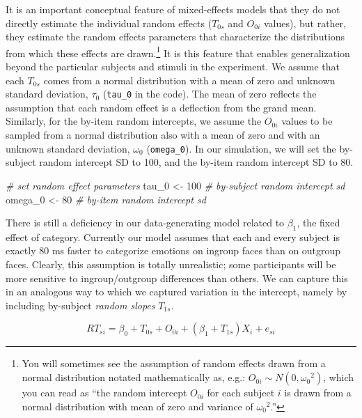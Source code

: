 \documentclass[
  english,
  doc,floatsintext]{apa6}
\newenvironment{Shaded}{\begin{snugshade}}{\end{snugshade}}
\newcommand{\CommentTok}[1]{\textcolor[rgb]{0.56,0.35,0.01}{\textit{#1}}}
\newcommand{\DecValTok}[1]{\textcolor[rgb]{0.00,0.00,0.81}{#1}}
\newcommand{\NormalTok}[1]{#1}
\newcommand{\StringTok}[1]{\textcolor[rgb]{0.31,0.60,0.02}{#1}}
\begin{document}
It is an important conceptual feature of mixed-effects models that they do not directly estimate the individual random effects (\(T_{0s}\) and \(O_{0i}\) values), but rather, they estimate the random effects parameters that characterize the distributions from which these effects are drawn.\footnote{You will sometimes see the assumption of random effects drawn from a normal distribution notated mathematically as, e.g.: $O_{0i} \sim N(0, {\omega_0}^2)$, which you can read as ``the random intercept $O_{0i}$ for each subject $i$ is drawn from a normal distribution with mean of zero and variance of ${\omega_0}^2$.''} It is this feature that enables generalization beyond the particular subjects and stimuli in the experiment. We assume that each \(T_{0s}\) comes from a normal distribution with a mean of zero and unknown standard deviation, \(\tau_0\) (\texttt{tau\_0} in the code). The mean of zero reflects the assumption that each random effect is a deflection from the grand mean. Similarly, for the by-item random intercepts, we assume the \(O_{0i}\) values to be sampled from a normal distribution also with a mean of zero and with an unknown standard deviation, \(\omega_0\) (\texttt{omega\_0}). In our simulation, we will set the by-subject random intercept SD to 100, and the by-item random intercept SD to 80.

\begin{Shaded}
\begin{Highlighting}[]
\CommentTok{# set random effect parameters}
\NormalTok{tau_}\DecValTok{0}\NormalTok{   <-}\StringTok{ }\DecValTok{100} \CommentTok{# by-subject random intercept sd}
\NormalTok{omega_}\DecValTok{0}\NormalTok{ <-}\StringTok{  }\DecValTok{80} \CommentTok{# by-item random intercept sd}
\end{Highlighting}
\end{Shaded}

There is still a deficiency in our data-generating model related to \(\beta_1\), the fixed effect of category. Currently our model assumes that each and every subject is exactly 80 ms faster to categorize emotions on ingroup faces than on outgroup faces. Clearly, this assumption is totally unrealistic; some participants will be more sensitive to ingroup/outgroup differences than others. We can capture this in an analogous way to which we captured variation in the intercept, namely by including by-subject \emph{random slopes} \(T_{1s}\).

\begin{equation}
RT_{si} = \beta_0 + T_{0s} + O_{0i} + \left(\beta_1 + T_{1s}\right) X_i + e_{si}
\end{equation}
\end{document}
